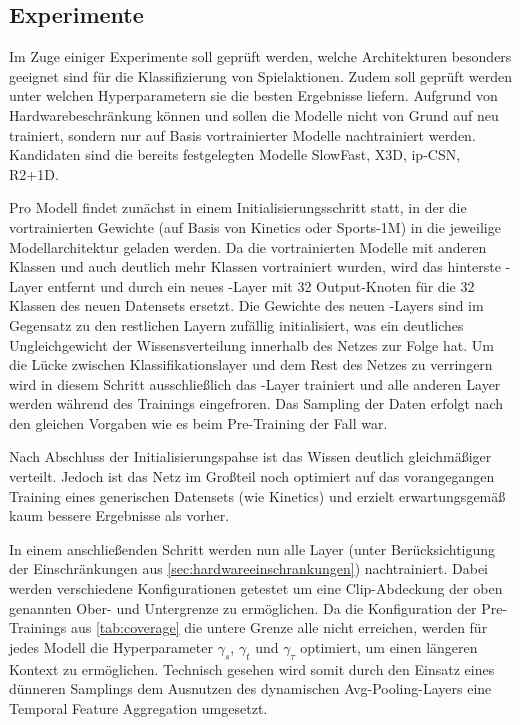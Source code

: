 \subsection{Experimente}
\label{subsec:experimente}

Im Zuge einiger Experimente soll geprüft werden, welche Architekturen besonders geeignet sind für die Klassifizierung von Spielaktionen.
Zudem soll geprüft werden unter welchen Hyperparametern sie die besten Ergebnisse liefern.
Aufgrund von Hardwarebeschränkung können und sollen die Modelle nicht von Grund auf neu trainiert, sondern nur auf Basis vortrainierter Modelle nachtrainiert werden.
Kandidaten sind die bereits festgelegten Modelle SlowFast, X3D, ip-CSN, R2+1D.

Pro Modell findet zunächst in einem Initialisierungsschritt statt, in der die vortrainierten Gewichte (auf Basis von Kinetics oder Sports-1M) in die jeweilige Modellarchitektur geladen werden.
Da die vortrainierten Modelle mit anderen Klassen und auch deutlich mehr Klassen vortrainiert wurden, wird das hinterste \fc-Layer entfernt und durch ein neues \fc-Layer mit 32 Output-Knoten für die 32 Klassen des neuen Datensets ersetzt.
Die Gewichte des neuen \fc-Layers sind im Gegensatz zu den restlichen Layern zufällig initialisiert, was ein deutliches Ungleichgewicht der Wissensverteilung innerhalb des Netzes zur Folge hat.
Um die Lücke zwischen Klassifikationslayer und dem Rest des Netzes zu verringern wird in diesem Schritt ausschließlich das \fc-Layer trainiert und alle anderen Layer werden während des Trainings eingefroren.
Das Sampling der Daten erfolgt nach den gleichen Vorgaben wie es beim Pre-Training der Fall war.

Nach Abschluss der Initialisierungspahse ist das Wissen deutlich gleichmäßiger verteilt.
Jedoch ist das Netz im Großteil noch optimiert auf das vorangegangen Training eines generischen Datensets (wie Kinetics) und erzielt erwartungsgemäß kaum bessere Ergebnisse als vorher.

In einem anschließenden Schritt werden nun alle Layer (unter Berücksichtigung der Einschränkungen aus \autoref{sec:hardwareeinschrankungen}) nachtrainiert.
Dabei werden verschiedene Konfigurationen getestet um eine Clip-Abdeckung der oben genannten Ober- und Untergrenze zu ermöglichen.
Da die Konfiguration der Pre-Trainings aus \autoref{tab:coverage} die untere Grenze alle nicht erreichen, werden für jedes Modell die Hyperparameter $\gamma_s$, $\gamma_t$ und $\gamma_\tau$ optimiert, um einen längeren Kontext zu ermöglichen.
Technisch gesehen wird somit durch den Einsatz eines dünneren Samplings \bzw dem Ausnutzen des dynamischen Avg-Pooling-Layers eine Temporal Feature Aggregation umgesetzt.

